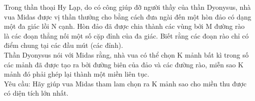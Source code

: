 Trong thần thoại Hy Lạp, do có công giúp đỡ người thầy của thần Dyonysus, nhà vua Midas được vị thần thưởng cho bằng  cách đưa ngài đến một hòn đảo có dạng một đa giác lồi N cạnh. Hòn đảo đã được chia thành các vùng bởi M đường rào là các đoạn thẳng nối một số cặp đỉnh của đa giác. Biết rằng các đoạn rào chỉ có điểm chung tại các đầu mút (các đỉnh).   
\\   Thần Dyonysus nói với Midas rằng, nhà vua có thể chọn K mảnh bất kì trong số các mảnh đã được tạo ra bởi đường biên của đảo và các đường rào, miễn sao K mảnh đó phải ghép lại thành một miền liên tục.   
\\   Yêu cầu: Hãy giúp vua Midas tham lam chọn ra K mảnh sao cho miền thu được có diện tích lớn nhất.  

\